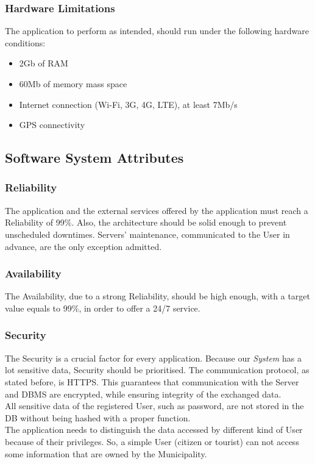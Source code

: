 \documentclass {article}
\begin{document}
	\subsubsection{Hardware Limitations}
	The application to perform as intended, should run under the following hardware conditions:
	\begin{itemize}
		\item 2Gb of RAM
		\item 60Mb of memory mass space
		\item Internet connection (Wi-Fi, 3G, 4G, LTE), at least 7Mb/s
		\item GPS connectivity
	\end{itemize}
	\subsection{Software System Attributes}
	\subsubsection{Reliability}
	The application and the external services offered by the application must reach a Reliability of 99\%. Also, the architecture should be solid enough to prevent unscheduled downtimes. Servers' maintenance, communicated to the User in advance, are the only exception admitted.
	\subsubsection{Availability}
	The Availability, due to a strong Reliability, should be high enough, with a target value equals to 99\%, in order to offer a 24/7 service.
	\subsubsection{Security}
	The Security is a crucial factor for every application. Because our {\it System} has a lot sensitive data, Security should be prioritised. The communication protocol, as stated before, is HTTPS. This guarantees that communication with the Server and DBMS are encrypted, while ensuring integrity of the exchanged data. \\
	All sensitive data of the registered User, such as password, are not stored in the DB without being hashed with a proper function. \\ 
	The application needs to distinguish the data accessed by different kind of User because of their privileges. So, a simple User (citizen or tourist) can not access some information that are owned by the Municipality. 
\end{document}
